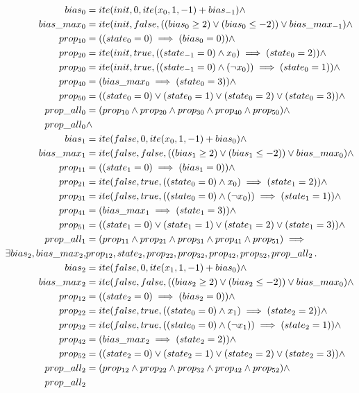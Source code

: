 \begin{equation}
\begin{aligned}
   bias_0&=ite(init, 0, ite(x_0, 1, -1)+bias_{-1}) \land \\
    bias\_max_0&=ite(init, false, ((bias_0\ge 2)\lor (bias_0\le -2))\lor bias\_max_{-1})\land \\
    prop_{10}&=((state_0=0)\implies(bias_0=0))\land \\
    prop_{20}&=ite(init, true, ((state_{-1}=0)\land x_0)\implies(state_0=2))\land \\
    prop_{30}&=ite(init, true, ((state_{-1}=0)\land (\neg x_0))\implies(state_0=1))\land \\
    prop_{40}&=(bias\_max_0\implies(state_0=3))\land \\
    prop_{50}&=((state_0=0) \lor (state_0=1) \lor (state_0=2) \lor (state_0=3))\land \\
    prop\_all_0&=(prop_{10}\land prop_{20}\land prop_{30}\land prop_{40} \land prop_{50})  \land \\
    prop\_all_0 &\land \\
    bias_1&=ite(false, 0, ite(x_0, 1, -1)+bias_0)\land \\
    bias\_max_1&=ite(false, false, ((bias_1\ge 2)\lor (bias_1\le-2))\lor bias\_max_0)\land \\
    prop_{11}&=((state_1=0)\implies(bias_1=0))\land \\
    prop_{21}&=ite(false, true, ((state_0=0)\land x_0)\implies(state_1=2))\land \\
    prop_{31}&=ite(false, true, ((state_0=0)\land (\neg x_0))\implies(state_1=1))\land \\
    prop_{41}&=(bias\_max_1\implies(state_1=3))\land \\
    prop_{51}&=((state_1=0) \lor (state_1=1) \lor (state_1=2) \lor (state_1=3))\land \\
    prop\_all_1&=(prop_{11}\land prop_{21}\land prop_{31}\land prop_{41} \land prop_{51})
\implies \\
\exists bias_2, bias\_max_2, &prop_{12}, state_2, prop_{22}, prop_{32}, prop_{42}, prop_{52}, prop\_all_2 \,.\,  \\
  bias_2&=ite(false, 0, ite(x_1, 1, -1)+bias_0) \land\\
  bias\_max_2&=ite(false, false, ((bias_2\ge 2) \lor (bias_2\le -2)) \lor bias\_max_0) \land\\
  prop_{12}&=((state_2=0)\implies (bias_2=0)) \land\\
  prop_{22}&=ite(false, true, ((state_0=0)\land x_1)\implies (state_2=2)) \land\\
  prop_{32}&=ite(false, true, ((state_0=0)\land (\neg x_1))\implies (state_2=1)) \land\\
  prop_{42}&=(bias\_max_2\implies (state_2=2)) \land\\
  prop_{52}&=((state_2=0) \lor (state_2=1) \lor (state_2=2) \lor (state_2=3))\land \\
  prop\_all_2&=(prop_{12}\land prop_{22}\land prop_{32}\land prop_{42} \land prop_{52})\land \\
  prop\_all_2&\notag
\end{aligned}
\end{equation}

